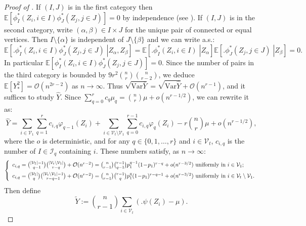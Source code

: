 \documentclass{article}
\theoremstyle{remark}
\def\m{\!-\!}
\def\O{\mathcal{O}}
\newcommand{\mean}[1]{\mathbb{E}\left[#1\right]}
\def\V{\mathrm{Var}}
\def\Vert{\mathcal{V}}
\begin{document}
\begin{proof}[Proof of ]
    If $(I,J)$ is in the first category then $\mean{\phi_I^*(Z_i,i\in I)\phi_J^*(Z_j,j\in J)}=0$ by independence (see ).
    If $(I,J)$ is in the second category, write $(\alpha,\beta)\in I\times J$ for the unique pair of connected or equal vertices.
    Then $I\setminus\{\alpha\}$ is independent of $J\setminus\{\beta\}$ and we can write a.s.:
    \begin{equation*}
        \mean{\left.\big. \phi_I^*(Z_i,i\in I)\phi_J^*(Z_j,j\in J) \;\right| Z_\alpha,Z_\beta}
        = \mean{\left.\big. \phi_I^*(Z_i,i\in I) \;\right| Z_\alpha} \mean{\left.\big. \phi_J^*(Z_j,j\in J) \;\right| Z_\beta} = 0 .
    \end{equation*}
    In particular $\mean{\phi_I^*(Z_i,i\in I)\phi_J^*(Z_j,j\in J)}=0$.
    Since the number of pairs in the third category is bounded by $9r^2\binom{n}{r}\binom{n}{r-2}$, we deduce $\mean{Y_*^2} = \O\left(n^{2r-2}\right)$ as $n\to\infty$.
    Thus $\sqrt{\V\bar Y} = \sqrt{\V\hat Y} + \O\left(n^{r-1}\right)$, and it suffices to study $\hat Y$.
    Since $\sum_{q=0}^r c_q\mu_q = \binom{n}{r}\mu + o\left(n^{r-1/2}\right)$, we can rewrite it as:
    \begin{equation*}
        \hat Y = \sum_{i\in \Vert_1}\sum_{q=1}^r c_{i,q}\varphi_{q-1}(Z_i)
        + \sum_{i\in \Vert_t\setminus \Vert_1}\sum_{q=0}^{r-1} c_{i,q}\varphi_{q}(Z_i)
        - r\binom{n}{r}\mu + o\left(n^{r-1/2}\right) ,
    \end{equation*}
    where the $o$ is deterministic, and for any $q\in\{0,1,\dots,r\}$ and $i\in \Vert_t$, $c_{i,q}$ is the number of $I\in\mathcal{I}_q$ containing $i$.
    These numbers satisfy, as $n\to\infty$:
    \begin{equation*}
        \left\{
        \begin{array}{ll}
        c_{i,q} = \binom{|\Vert_1|-1}{q-1}\binom{|\Vert_t\setminus \Vert_1|}{r-q} + \O(n^{r-2}) = \binom{n}{r-1}\binom{r-1}{q-1}p_1^{q-1}(1\m p_1)^{r-q} + o(n^{r-3/2})
        \text{ uniformly in }i\in \Vert_1\vspace{.5em} ;\\
        c_{i,q} = \binom{|\Vert_1|}{q}\binom{|\Vert_t\setminus \Vert_1|-1}{r-q-1} + \O(n^{r-2}) = \binom{n}{r-1}\binom{r-1}{q}p_1^{q}(1\m p_1)^{r-q-1} + o(n^{r-3/2})
        \text{ uniformly in }i\in \Vert_t\setminus \Vert_1 .
        \end{array}
        \right.
    \end{equation*}
    Then define
    \begin{equation*}
        \widetilde Y := \binom{n}{r\m1}\sum_{i\in \Vert_t} \left(\big. \psi(Z_i) - \mu\right) .

\end{equation*}
\end{proof}
\end{document}
